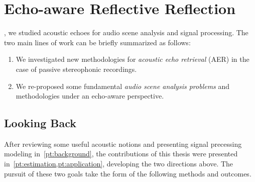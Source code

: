 \chapter{Echo-aware Reflective Reflection}\label{ch:conclusion}


\vspace{-2.5em}
, we studied acoustic echoes for audio scene analysis and signal processing.
The two main lines of work can be briefly summarized as follows:
\begin{enumerate}[label=\Alph*.]
    \item We investigated new methodologies for \textit{acoustic echo retrieval} (AER) in the case of passive stereophonic recordings.
    \item We re-proposed some fundamental \textit{audio scene analysis problems} and methodologies under an echo-aware perspective.
\end{enumerate}

\section{Looking Back}
After reviewing some useful acoustic notions and presenting signal precessing modeling in~\cref{pt:background}, the contributions of this thesis were presented in~\cref{pt:estimation,pt:application}, developing the two directions above.
The pursuit of these two goals take the form of the following methods and outcomes.

